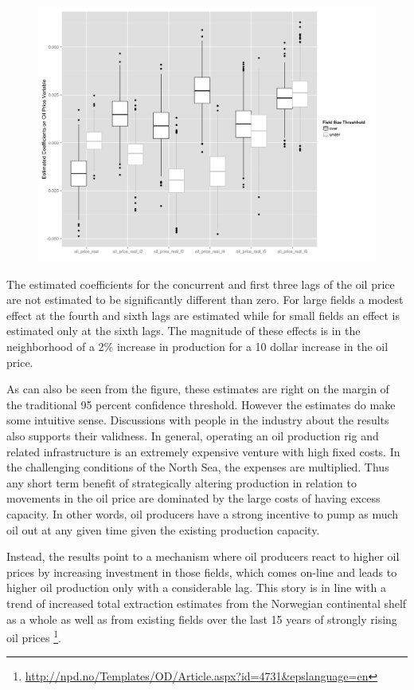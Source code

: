 \documentclass[12pt]{scrartcl} %
\begin{document}
\begin{figure}
	\includegraphics[width=.8\textwidth]{gam_price_dirty_box.png}
	\caption{}
	\label{gam_price_dirty_box}
\end{figure}

The estimated coefficients for the concurrent and first three lags of the oil price are not estimated to be significantly different than zero.  For large fields a modest effect at the fourth and sixth lags are estimated while for small fields an effect is estimated only at the sixth lags. The magnitude of these effects is in the neighborhood of a 2\% increase in production for a 10 dollar increase in the oil price.  

As can also be seen from the figure, these estimates are right on the margin of the traditional 95 percent confidence threshold.  However the estimates do make some intuitive sense.  Discussions with people in the industry about the results also supports their validness.  In general, operating an oil production rig and related infrastructure is an extremely expensive venture with high fixed costs.  In the challenging conditions of the North Sea, the expenses are multiplied.  Thus any short term benefit of strategically altering production in relation to movements in the oil price are dominated by the large costs of having excess capacity.  In other words, oil producers have a strong incentive to pump as much oil out at any given time given the existing production capacity.  

Instead, the results point to a mechanism where oil producers react to higher oil prices by increasing investment in those fields, which comes on-line and leads to higher oil production only with a considerable lag.   This story is in line with a trend of increased total extraction estimates from the Norwegian continental shelf as a whole as well as from existing fields over the last 15 years of strongly rising oil prices \footnote{\url{http://npd.no/Templates/OD/Article.aspx?id=4731&epslanguage=en}}.
\end{document}
